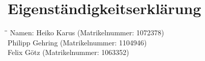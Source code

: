 \documentclass[
a4paper,
10pt,
headsepline,           %
oneside,               %
numbers=noenddot,	   %
bibliography=totoc,    %
]{scrbook}
\newcounter{SeitenzahlSpeicher}
\newcommand{\Heiko}{Heiko Karus}
\newcommand{\Philipp}{Philipp Gehring}
\newcommand{\Felix}{Felix Götz}
\newcommand{\Hmatnr}{1072378}
\newcommand{\Pmatnr}{1104946}
\newcommand{\Fmatnr}{1063352}
\begin{document}
\clearpage
\appendix
{}
\setcounter{page}{\theSeitenzahlSpeicher}




\backmatter

\clearpage
\printbibliography

\clearpage
\lstlistoflistings
{}




%

%

\clearpage
\thispagestyle{empty}
\chapter{Eigenständigkeitserklärung}

\begin{tabbing}
\hspace{30mm}\=\hspace{60mm}\=\kill
Namen: \> \Heiko \> (Matrikelnummer: \Hmatnr) \\ 
  \>  \Philipp \> (Matrikelnummer: \Pmatnr) \\ 
  \>  \Felix \> (Matrikelnummer: \Fmatnr)
\end{tabbing} 

\end{document}
